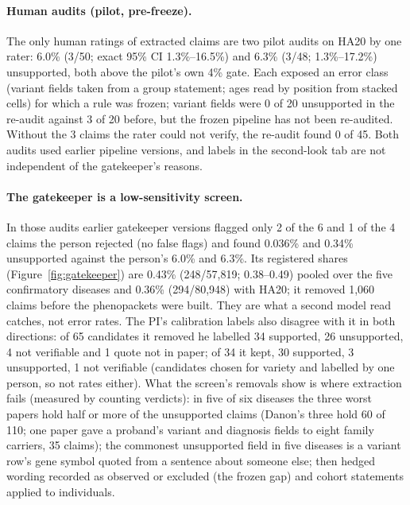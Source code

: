 \documentclass{article} %
\begin{document}
\paragraph{Human audits (pilot, pre-freeze).} The only human ratings of extracted claims are two pilot audits on HA20 by one rater: 6.0\% (3/50; exact 95\% CI 1.3\%--16.5\%) and 6.3\% (3/48; 1.3\%--17.2\%) unsupported, both above the pilot's own 4\% gate. Each exposed an error class (variant fields taken from a group statement; ages read by position from stacked cells) for which a rule was frozen; variant fields were 0 of 20 unsupported in the re-audit against 3 of 20 before, but the frozen pipeline has not been re-audited. Without the 3 claims the rater could not verify, the re-audit found 0 of 45. Both audits used earlier pipeline versions, and labels in the second-look tab are not independent of the gatekeeper's reasons.

\paragraph{The gatekeeper is a low-sensitivity screen.} In those audits earlier gatekeeper versions flagged only 2 of the 6 and 1 of the 4 claims the person rejected (no false flags) and found 0.036\% and 0.34\% unsupported against the person's 6.0\% and 6.3\%. Its registered shares (Figure~\ref{fig:gatekeeper}) are 0.43\% (248/57,819; 0.38--0.49) pooled over the five confirmatory diseases and 0.36\% (294/80,948) with HA20; it removed 1,060 claims before the phenopackets were built. They are what a second model read catches, not error rates. The PI's calibration labels also disagree with it in both directions: of 65 candidates it removed he labelled 34 supported, 26 unsupported, 4 not verifiable and 1 quote not in paper; of 34 it kept, 30 supported, 3 unsupported, 1 not verifiable (candidates chosen for variety and labelled by one person, so not rates either). What the screen's removals show is where extraction fails (measured by counting verdicts): in five of six diseases the three worst papers hold half or more of the unsupported claims (Danon's three hold 60 of 110; one paper gave a proband's variant and diagnosis fields to eight family carriers, 35 claims); the commonest unsupported field in five diseases is a variant row's gene symbol quoted from a sentence about someone else; then hedged wording recorded as observed or excluded (the frozen gap) and cohort statements applied to individuals.
\end{document}
